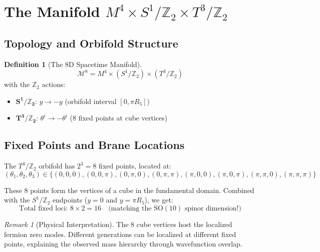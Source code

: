 \documentclass[11pt,a4paper]{article}
\theoremstyle{plain}
\theoremstyle{definition}
\newtheorem{definition}[theorem]{Definition}
\theoremstyle{remark}
\newtheorem{remark}[theorem]{Remark}
\newcommand{\Tthree}{T^3}
\newcommand{\Ztwo}{\mathbb{Z}_2}
\newcommand{\SOten}{\text{SO}(10)}
\begin{document}
\section{The Manifold $M^4 \times S^1/\Ztwo \times \Tthree/\Ztwo$}

\subsection{Topology and Orbifold Structure}

\begin{definition}[The 8D Spacetime Manifold]
\begin{equation}
\mathscr{M}^8 = M^4 \times (S^1/\Ztwo) \times (\Tthree/\Ztwo)
\end{equation}
with the $\Ztwo$ actions:
\begin{itemize}
  \item $\mathbf{S^1/\Ztwo}$: $y \rightarrow -y$ (orbifold interval $[0, \pi R_5]$)
  \item $\mathbf{\Tthree/\Ztwo}$: $\theta^i \rightarrow -\theta^i$ (8 fixed points at cube vertices)
\end{itemize}
\end{definition}

\subsection{Fixed Points and Brane Locations}

The $\Tthree/\Ztwo$ orbifold has $2^3 = 8$ fixed points, located at:
\begin{equation}
(\theta_1, \theta_2, \theta_3) \in \{(0,0,0), (0,0,\pi), (0,\pi,0), (0,\pi,\pi), (\pi,0,0), (\pi,0,\pi), (\pi,\pi,0), (\pi,\pi,\pi)\}
\end{equation}

These 8 points form the vertices of a cube in the fundamental domain. Combined with the $S^1/\Ztwo$ endpoints ($y=0$ and $y=\pi R_5$), we get:
\begin{equation}
\text{Total fixed loci: } 8 \times 2 = 16 \quad \text{(matching the } \SOten \text{ spinor dimension!)}
\end{equation}

\begin{remark}[Physical Interpretation]
The 8 cube vertices host the localized fermion zero modes. Different generations can be localized at different fixed points, explaining the observed mass hierarchy through wavefunction overlap.
\end{remark}
\end{document}
